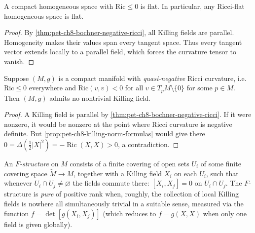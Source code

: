 \begin{corollary}
  \label{cor:pet-ch8-homogeneous-negative-ricci-flat}
  A compact homogeneous space with $\mathrm{Ric}\le0$ is flat. In particular,
  any Ricci-flat homogeneous space is flat.
\end{corollary}
\begin{proof}
  \sketch
  By \cref{thm:pet-ch8-bochner-negative-ricci}, all Killing fields are
  parallel. Homogeneity makes their values span every tangent space. Thus
  every tangent vector extends locally to a parallel field, which forces the
  curvature tensor to vanish.
\end{proof}

\begin{theorem}
  \label{thm:pet-ch8-quasi-negative-ricci-no-killing}
  Suppose $(M,g)$ is a compact manifold with \emph{quasi-negative} Ricci
  curvature, i.e.\ $\mathrm{Ric}\le0$ everywhere and $\mathrm{Ric}(v,v)<0$ for
  all $v\in T_pM\setminus\{0\}$ for some $p\in M$. Then $(M,g)$ admits no
  nontrivial Killing field.
\end{theorem}
\begin{proof}
  \sketch
  A Killing field is parallel by
  \cref{thm:pet-ch8-bochner-negative-ricci}. If it were nonzero, it would be
  nonzero at the point where Ricci curvature is negative definite. But
  \cref{prop:pet-ch8-killing-norm-formulas} would give there
  \(0=\Delta(\tfrac12|X|^2)=-\operatorname{Ric}(X,X)>0\), a contradiction.
\end{proof}

\begin{definition}[$F$-structure]
  \label{def:pet-ch8-f-structure}
  An \emph{$F$-structure} on $M$ consists of a finite covering of open sets
  $U_i$ of some finite covering space $\widetilde M\to M$, together with a
  Killing field $X_i$ on each $U_i$, such that whenever $U_i\cap U_j\ne\varnothing$
  the fields commute there: $[X_i,X_j]=0$ on $U_i\cap U_j$. The $F$-structure is
  \emph{pure} of positive rank when, roughly, the collection of local Killing
  fields is nowhere all simultaneously trivial in a suitable sense, measured via
  the function $f=\det[g(X_i,X_j)]$ (which reduces to $f=g(X,X)$ when only one
  field is given globally).
\end{definition}

